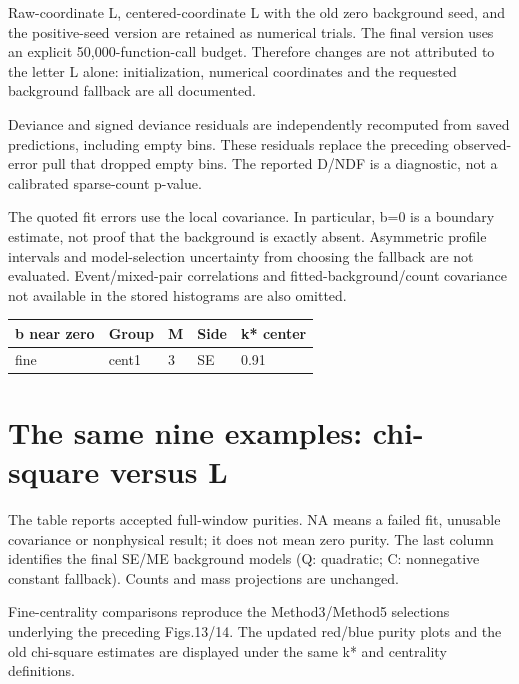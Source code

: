 \documentclass[10pt,a4paper]{article}
\begin{document}
Raw-coordinate L, centered-coordinate L with the old zero background seed, and the positive-seed version are retained as numerical trials. The final version uses an explicit 50,000-function-call budget. Therefore changes are not attributed to the letter L alone: initialization, numerical coordinates and the requested background fallback are all documented.

Deviance and signed deviance residuals are independently recomputed from saved predictions, including empty bins. These residuals replace the preceding observed-error pull that dropped empty bins. The reported D/NDF is a diagnostic, not a calibrated sparse-count p-value.

The quoted fit errors use the local covariance. In particular, b=0 is a boundary estimate, not proof that the background is exactly absent. Asymmetric profile intervals and model-selection uncertainty from choosing the fallback are not evaluated. Event/mixed-pair correlations and fitted-background/count covariance not available in the stored histograms are also omitted.

{\small\setlength{\tabcolsep}{3pt}\begin{longtable}{lllll}\toprule
b near zero & Group & M & Side & k* center\\\midrule\endhead
fine & cent1 & 3 & SE & 0.91\\
\bottomrule\end{longtable}}
\clearpage
\section*{The same nine examples: chi-square versus L}
The table reports accepted full-window purities. NA means a failed fit, unusable covariance or nonphysical result; it does not mean zero purity. The last column identifies the final SE/ME background models (Q: quadratic; C: nonnegative constant fallback). Counts and mass projections are unchanged.

Fine-centrality comparisons reproduce the Method3/Method5 selections underlying the preceding Figs.13/14. The updated red/blue purity plots and the old chi-square estimates are displayed under the same k* and centrality definitions.
\end{document}
